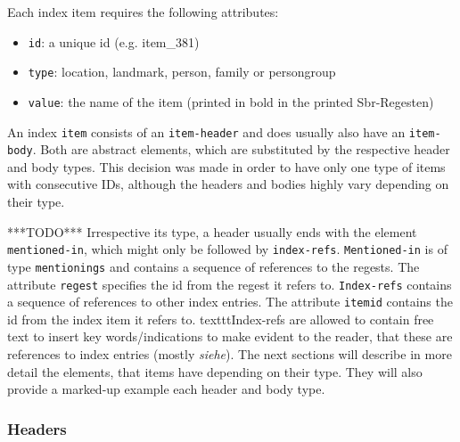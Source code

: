 Each index item requires the following attributes: 
\begin{itemize}
\item \texttt{id}: a unique id (e.g. item\_381)
\item \texttt{type}: location, landmark, person, family or persongroup
\item \texttt{value}: the name of the item (printed in bold in the printed Sbr-Regesten)
\end{itemize}


An index \texttt{item} consists of an \texttt{item-header} and does usually also have an \texttt{item-body}. Both are abstract elements, which are substituted by the respective header and body types. This decision was made in order to have only one type of items with consecutive IDs, although the headers and bodies highly vary depending on their type.

***TODO***
Irrespective its type, a header usually ends with the element \texttt{mentioned-in}, which might only be followed by \texttt{index-refs}. \texttt{Mentioned-in} is of type \texttt{mentionings} and contains a sequence of references to the regests. The attribute \texttt{regest} specifies the id from the regest it refers to. \texttt{Index-refs} contains  a sequence of references to other index entries. The attribute \texttt{itemid} contains the id from the index item it refers to. texttt{Index-refs} are allowed to contain free text to insert key words/indications to make evident to the reader, that these are references to index entries (mostly \textit{siehe}).
The next sections will describe in more detail the elements, that items have depending on their type. They will also provide a marked-up example each header and body type.

\subsubsection{Headers}
\label{header-xml}

